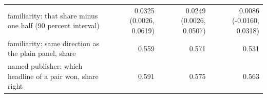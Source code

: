 \begin{tabular}{p{7.6cm}rrr}
familiarity: that share minus one half (90 percent interval) & 0.0325 (0.0026, 0.0619) & 0.0249 (0.0026, 0.0507) & 0.0086 (-0.0160, 0.0318) \\
familiarity: same direction as the plain panel, share & 0.559 & 0.571 & 0.531 \\
named publisher: which headline of a pair won, share right & 0.591 & 0.575 & 0.563 \\
\bottomrule
\end{tabular}
